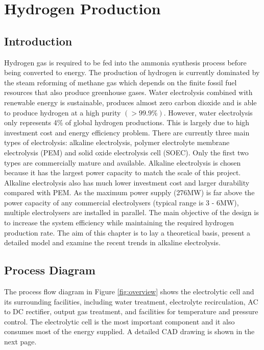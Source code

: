 \documentclass[11pt, a4paper]{article}
\begin{document}
 

\section{Hydrogen Production}
\subsection{Introduction} 


Hydrogen gas is required to be fed into the ammonia synthesis process before being converted to energy. The production of hydrogen is currently dominated by the steam reforming of methane gas which depends on the finite fossil fuel resources that also produce greenhouse gases. Water electrolysis combined with renewable energy is sustainable, produces almost zero carbon dioxide and is able to produce hydrogen at a high purity $(>99.9\%)$. However, water electrolysis only represents 4\% of global hydrogen productions.\cite{reversible} This is largely due to high investment cost and energy efficiency problem. There are currently three main types of electrolysis: alkaline electrolysis, polymer electrolyte membrane electrolysis (PEM) and solid oxide electrolysis cell (SOEC). Only the first two types are commercially mature and available. Alkaline electrolysis is chosen because it has the largest power capacity to match the scale of this project. Alkaline electrolysis also has much lower investment cost and larger durability compared with PEM. As the maximum power supply (276MW) is far above the power capacity of any commercial electrolysers (typical range is 3 - 6MW\cite{gibbs}), multiple electrolysers are installed in parallel.
The main objective of the design is to increase the system efficiency while maintaining the required hydrogen production rate. The aim of this chapter is to lay a theoretical basis, present a detailed model  and examine the recent trends in alkaline electrolysis. 

\subsection{Process Diagram} 
The process flow diagram in Figure \ref{fig:overview} shows the electrolytic cell and its surrounding facilities, including water treatment, electrolyte recirculation, AC to DC rectifier, output gas treatment, and facilities for temperature and pressure control. The electrolytic cell is the most important component and it also consumes most of the energy supplied. A detailed CAD drawing is shown in the next page.
\end{document}
